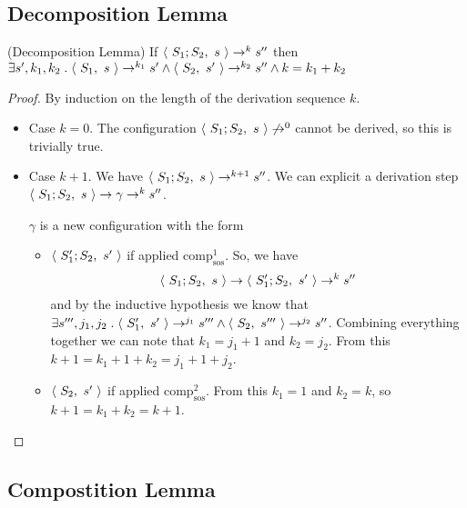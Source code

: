 \documentclass[12pt,a4paper,oneside]{book}
\begin{document}
\subsection{Decomposition Lemma}

\begin{theorem}{(Decomposition Lemma)}
    If $\langle\ S_1; S_2,\ s\ \rangle \to^k s''$ then $\exists s', k_1, k_2 \mathrel{.} \langle\ S_1,\ s\ \rangle \to^{k_1} s' \land \langle\ S_2,\ s'\ \rangle \to^{k_2} s'' \land k = k_1 + k_2$

    \begin{proof}
        By induction on the length of the derivation sequence $k$.

        \begin{itemize}
            \item Case $k=0$. The configuration $\langle\ S_1;S_2,\ s\ \rangle \not\to^0$ cannot be derived, so this is trivially true.

            \item Case $k+1$. We have $\langle\ S_1;S_2,\ s\ \rangle \to^{k+1} s''$. We can explicit a derivation step $\langle\ S_1;S_2,\ s\ \rangle \to \gamma \to^{k} s''$.

            $\gamma$ is a new configuration with the form
            \begin{itemize}
                \item $\langle\ S_1';S_2,\ s'\ \rangle$ if applied $\textrm{comp}^{1}_{\textrm{sos}}$. So, we have
                \[
                    \langle\ S_1;S_2,\ s\ \rangle \to \langle\ S_1';S_2,\ s'\ \rangle \to^{k} s''
                \]
                and by the inductive hypothesis we know that $\exists s''', j_1, j_2 \mathrel{.} \langle\ S_1',\ s'\ \rangle \to^{j_1} s''' \land \langle\ S_2,\ s'''\ \rangle \to^{j_2} s''$. Combining everything together we can note that $k_1 = j_1 + 1$ and $k_2 = j_2$. From this $k + 1 = k_1 + 1 + k_2 = j_1 + 1 + j_2$.

                \item $\langle\ S_2,\ s'\ \rangle$ if applied $\textrm{comp}^{2}_{\textrm{sos}}$. From this $k_1 = 1$ and $k_2 = k$, so $k + 1 = k_1 + k_2 = k + 1$.
            \end{itemize}
        \end{itemize}
    \end{proof}
\end{theorem}

\subsection{Compostition Lemma}
\end{document}
